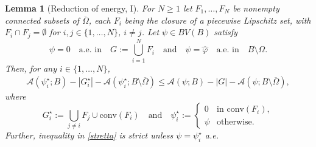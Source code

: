 \documentclass[11pt]{article}
\numberwithin{equation}{section}
\let\Om\Omega
\newtheorem{lemma}[theorem]{Lemma}
\theoremstyle{definition}
\begin{document}
\begin{lemma}[Reduction of energy, I]
\label{lem:reduction_of_energy_I}
For $N\ge1$ let $F_1,\dots,F_N$ be
nonempty connected subsets of $\overline \Om$,
each $F_i$ being the closure of a piecewise Lipschitz
set, with $F_i \cap F_j= \emptyset$ for $i,j \in \{1,\dots,
N\}$, $i\neq j$.
Let $\psi\in BV(B)$ satisfy
\begin{equation}\label{eq:psi_0_union}
\psi=0\quad\text{a.e. in}\quad G:=\bigcup_{i=1}^NF_i\quad\text{and}\quad
\psi=\widehat{\varphi}\quad\text{a.e. in}\quad B\setminus{\Om}.
\end{equation}
Then, for any $i\in\{1,\dots,N\}$,
\begin{align}\label{stretta}
\mathcal A(\psi_i^\star;B)-|G_i^\star|-\mathcal A(\psi_i^\star;B\setminus \overline\Omega)\leq
\mathcal A(\psi;B)-|G|-\mathcal A(\psi;B\setminus \overline\Omega),
\end{align}
where
\begin{equation}\label{def:E_star,Psi_star}
G_i^\star:=\bigcup_{j\neq i}F_j\cup \mathrm{conv}(F_i)\quad\text{and}\quad
\psi_i^\star :=\begin{cases}
0&\text{in } \mathrm{conv}(F_i),\\
\psi&\text{otherwise.}
\end{cases}
\end{equation} Further, inequality in \eqref{stretta} is strict unless $\psi=\psi^\star_i$ a.e.
\end{lemma}
\end{document}
